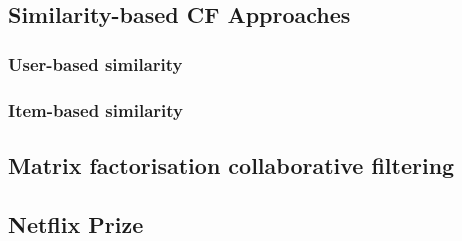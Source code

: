 \subsection{Similarity-based CF Approaches}
\subsubsection{User-based similarity}
\subsubsection{Item-based similarity}

\subsection{Matrix factorisation collaborative filtering}

\subsection{Netflix Prize}
